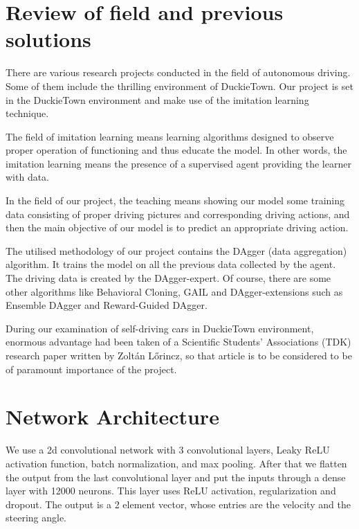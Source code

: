 \documentclass{article}
\begin{document}
\section*{Review of field and previous solutions}

There are various research projects conducted in the field of autonomous driving. Some of them include the thrilling environment of DuckieTown. Our project is set in the DuckieTown environment and make use of the imitation learning technique.

The field of imitation learning means learning algorithms designed to observe proper operation of functioning and thus educate the model. In other words, the imitation learning means the presence of a supervised agent providing the learner with data.

In the field of our project, the teaching means showing our model some training data consisting of proper driving pictures and corresponding driving actions, and then the main objective of our model is to predict an appropriate driving action.

The utilised methodology of our project contains the DAgger (data aggregation) algorithm. It trains the model on all the previous data collected by the agent. The driving data is created by the DAgger-expert. Of course, there are some other algorithms like Behavioral Cloning, GAIL and DAgger-extensions such as Ensemble DAgger and Reward-Guided DAgger.

During our examination of self-driving cars in DuckieTown environment, enormous advantage had been taken of a Scientific Students' Associations (TDK) research paper written by Zoltán Lőrincz, so that article is to be considered to be of paramount importance of the project. 


\pagebreak

\section*{Network Architecture}
We use a 2d convolutional network with 3 convolutional layers, Leaky ReLU activation function, batch normalization, and max pooling. After that we flatten the output from the last convolutional layer and put the inputs through a dense layer with 12000 neurons. This layer uses ReLU activation, regularization and dropout. The output is a 2 element vector, whose entries are the velocity and the steering angle.
\end{document}
